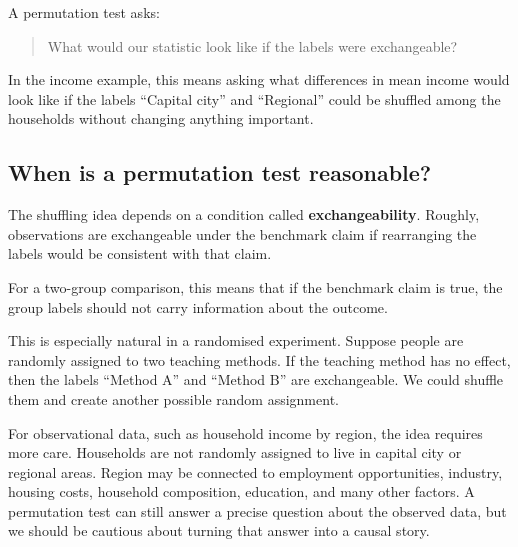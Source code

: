 \documentclass[
  letterpaper,
  DIV=11,
  numbers=noendperiod]{scrreprt}
\begin{document}
\begin{tcolorbox}[enhanced jigsaw, arc=.35mm, bottomrule=.15mm, bottomtitle=1mm, breakable, colback=white, colbacktitle=quarto-callout-important-color!10!white, colframe=quarto-callout-important-color-frame, coltitle=black, left=2mm, leftrule=.75mm, opacityback=0, opacitybacktitle=0.6, rightrule=.15mm, title=\textcolor{quarto-callout-important-color}{\faExclamation}\hspace{0.5em}{The key question for a permutation test}, titlerule=0mm, toprule=.15mm, toptitle=1mm]

A permutation test asks:

\begin{quote}
What would our statistic look like if the labels were exchangeable?
\end{quote}

In the income example, this means asking what differences in mean income
would look like if the labels ``Capital city'' and ``Regional'' could be
shuffled among the households without changing anything important.

\end{tcolorbox}

\subsection{When is a permutation test
reasonable?}\label{when-is-a-permutation-test-reasonable}

The shuffling idea depends on a condition called
\textbf{exchangeability}. Roughly, observations are exchangeable under
the benchmark claim if rearranging the labels would be consistent with
that claim.

For a two-group comparison, this means that if the benchmark claim is
true, the group labels should not carry information about the outcome.

This is especially natural in a randomised experiment. Suppose people
are randomly assigned to two teaching methods. If the teaching method
has no effect, then the labels ``Method A'' and ``Method B'' are
exchangeable. We could shuffle them and create another possible random
assignment.

For observational data, such as household income by region, the idea
requires more care. Households are not randomly assigned to live in
capital city or regional areas. Region may be connected to employment
opportunities, industry, housing costs, household composition,
education, and many other factors. A permutation test can still answer a
precise question about the observed data, but we should be cautious
about turning that answer into a causal story.
\end{document}
